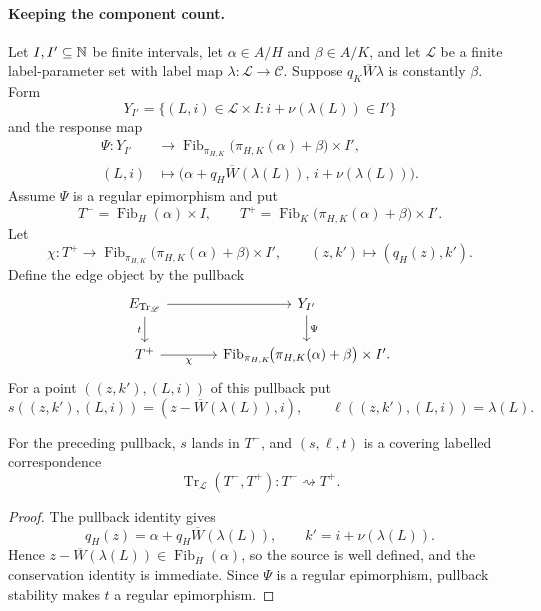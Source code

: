 \paragraph{Keeping the component count.}
Let $I,I'\subseteq\mathbb N$ be finite intervals, let $\alpha\in A/H$ and $\beta\in A/K$, and let $\mathscr L$ be a finite label-parameter set with label map $\lambda:\mathscr L\to\mathcal C$.  Suppose $q_K\overline W\lambda$ is constantly $\beta$.  Form
\[
Y_{I'}=\{(L,i)\in\mathscr L\times I:i+\nu(\lambda(L))\in I'\}
\]
and the response map
\begin{equation}\label{eq:graded-quotient-regular-epi}
\begin{aligned}
\Psi:Y_{I'}&\longrightarrow
\operatorname{Fib}_{\pi_{H,K}}\!\bigl(\pi_{H,K}(\alpha)+\beta\bigr)\times I',\\
(L,i)&\longmapsto
\bigl(\alpha+q_H\overline W(\lambda(L)),\,i+\nu(\lambda(L))\bigr).
\end{aligned}
\end{equation}
Assume $\Psi$ is a regular epimorphism and put
\[
T^-=\operatorname{Fib}_H(\alpha)\times I,
\qquad
T^+=\operatorname{Fib}_K\!\bigl(\pi_{H,K}(\alpha)+\beta\bigr)\times I'.
\]
Let
\[
\chi:T^+\longrightarrow
\operatorname{Fib}_{\pi_{H,K}}\!\bigl(\pi_{H,K}(\alpha)+\beta\bigr)\times I',
\qquad
(z,k')\longmapsto(q_H(z),k').
\]
Define the edge object by the pullback
\begin{equation}\label{eq:graded-local-translation}
\begin{tikzcd}[column sep=large]
E_{\operatorname{Tr}_{\mathscr L}} \arrow[r] \arrow[d,"{t}"']
  & Y_{I'} \arrow[d,"{\Psi}"]\\
T^+ \arrow[r,"{\chi}"']
  & \operatorname{Fib}_{\pi_{H,K}}\!\bigl(\pi_{H,K}(\alpha)+\beta\bigr)\times I'.
\end{tikzcd}
\end{equation}
For a point $((z,k'),(L,i))$ of this pullback put
\[
s((z,k'),(L,i))=(z-\overline W(\lambda(L)),i),
\qquad
\ell((z,k'),(L,i))=\lambda(L).
\]
\begin{corollary}\label{cor:graded-affine-translation}
For the preceding pullback, $s$ lands in $T^-$, and $(s,\ell,t)$ is a covering labelled correspondence
\[
\operatorname{Tr}_{\mathscr L}(T^-,T^+):T^-\rightsquigarrow T^+.
\]
\end{corollary}

\begin{proof}
The pullback identity gives
\[
q_H(z)=\alpha+q_H\overline W(\lambda(L)),
\qquad
k'=i+\nu(\lambda(L)).
\]
Hence $z-\overline W(\lambda(L))\in\operatorname{Fib}_H(\alpha)$, so the source is well defined, and the conservation identity is immediate.  Since $\Psi$ is a regular epimorphism, pullback stability makes $t$ a regular epimorphism.
\end{proof}

